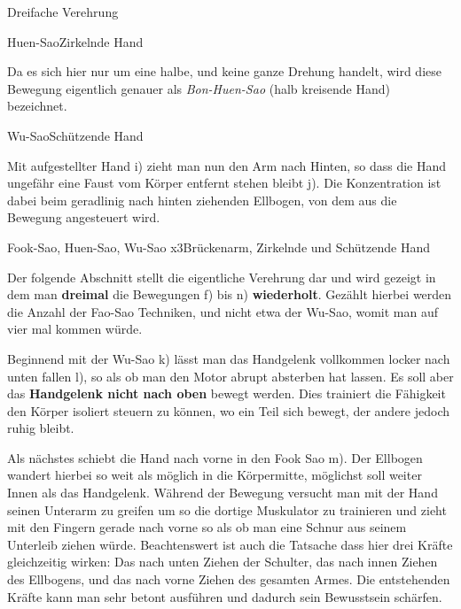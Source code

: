 \begin{WTSatz}{Dreifache Verehrung}
\begin{WTSatzTeil}{Huen-Sao}{Zirkelnde Hand}
		\begin{WTCommonBegriff}
			Da es sich hier nur um eine halbe, und keine ganze Drehung handelt, wird diese Bewegung eigentlich genauer als \textit{Bon-Huen-Sao} (halb kreisende Hand) bezeichnet.
		\end{WTCommonBegriff}

	\end{WTSatzTeil}
	\begin{WTSatzTeil}{Wu-Sao}{Sch\"utzende Hand}
		
		Mit aufgestellter Hand i) zieht man nun den Arm nach Hinten, so dass die Hand ungef\"ahr eine Faust vom K\"orper entfernt stehen bleibt j). Die Konzentration ist dabei beim geradlinig nach hinten ziehenden Ellbogen, von dem aus die Bewegung angesteuert wird.
		
	\end{WTSatzTeil}
	\begin{WTSatzTeil}{Fook-Sao, Huen-Sao, Wu-Sao x3}{Br\"uckenarm, Zirkelnde und Sch\"utzende Hand}
		
		Der folgende Abschnitt stellt die eigentliche Verehrung dar und wird gezeigt in dem man \textbf{dreimal} die Bewegungen f) bis n) \textbf{wiederholt}. Gez\"ahlt hierbei werden die Anzahl der Fao-Sao Techniken, und nicht etwa der Wu-Sao, womit man auf vier mal kommen w\"urde.

		
		Beginnend mit der Wu-Sao k) l\"asst man das Handgelenk vollkommen locker nach unten fallen l), so als ob man den Motor abrupt absterben hat lassen\label{LBL_motorabsterben}. Es soll aber das \textbf{Handgelenk nicht nach oben} bewegt werden. Dies trainiert die F\"ahigkeit den K\"orper isoliert steuern zu k\"onnen, wo ein Teil sich bewegt, der andere jedoch ruhig bleibt.

		Als n\"achstes schiebt die Hand nach vorne in den Fook Sao m). Der Ellbogen wandert hierbei so weit als m\"oglich in die K\"orpermitte, m\"oglichst soll weiter Innen als das Handgelenk. W\"ahrend der Bewegung versucht man mit der Hand seinen Unterarm zu greifen um so die dortige Muskulator zu trainieren und zieht mit den Fingern gerade nach vorne so als ob man eine Schnur aus seinem Unterleib ziehen w\"urde. Beachtenswert ist auch die Tatsache dass hier drei Kr\"afte gleichzeitig wirken: Das nach unten Ziehen der Schulter, das nach innen Ziehen des Ellbogens, und das nach vorne Ziehen des gesamten Armes. Die entstehenden Kr\"afte kann man sehr betont ausf\"uhren und dadurch sein Bewusstsein sch\"arfen.


\end{WTSatzTeil}
\end{WTSatz}
